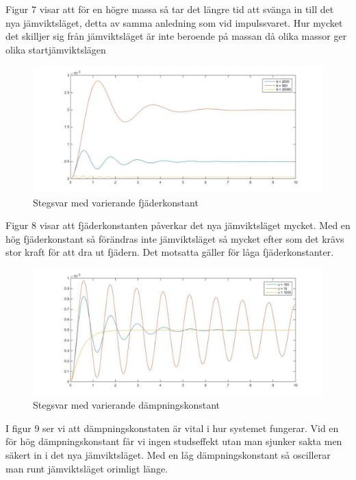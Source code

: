 \documentclass[10pt,a4paper]{article}
\begin{document}
Figur 7 visar att för en högre massa så tar det längre tid att svänga in till det nya jämviktsläget, detta av samma anledning som vid impulssvaret. Hur mycket det skilljer sig från jämviktsläget är inte beroende på massan då olika massor ger olika startjämviktslägen

\begin{figure}[h]
\begin{center}
\includegraphics[scale=0.4]{stegsvar(fjader)}
\caption{Stegsvar med varierande fjäderkonstant}
\end{center}
\end{figure}

Figur 8 visar att fjäderkonstanten påverkar det nya jämviktsläget mycket. Med en hög fjäderkonstant så förändras inte jämviktsläget så mycket efter som det krävs stor kraft för att dra ut fjädern. Det motsatta gäller för låga fjäderkonstanter.

\begin{figure}[h]
\begin{center}
\includegraphics[scale=0.4]{stegsvar(dampning)}
\caption{Stegsvar med varierande dämpningskonstant}
\end{center}
\end{figure}

I figur 9 ser vi att dämpningskonstaten är vital i hur systemet fungerar. Vid en för hög dämpningskonstant får vi ingen studseffekt utan man sjunker sakta men säkert in i det nya jämviktsläget. Med en låg dämpningskonstant så oscillerar man runt jämviktsläget orimligt länge.
\end{document}
